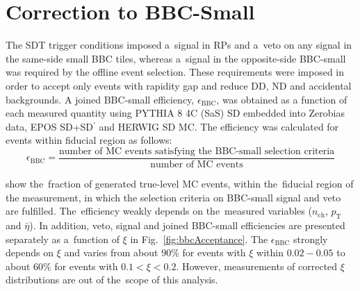 \section{Correction to BBC-Small }\label{section:star_bbc}
The SDT trigger conditions imposed a~signal in RPs and a~veto on any signal in the same-side small BBC tiles, whereas a~signal in the opposite-side BBC-small was required by the offline event selection. These requirements were imposed in order to accept only events with rapidity gap and reduce \ac{DD}, \ac{ND} and accidental backgrounds.  A joined BBC-small efficiency, $\epsilon_\textrm{BBC}$, was obtained as a function of each measured quantity using  PYTHIA 8 4C (SaS) SD embedded into Zerobias data, EPOS SD+SD$^\prime$ and HERWIG SD \ac{MC}. The efficiency was calculated  for events within fiducial region as follows:
\begin{equation}
\epsilon_\textrm{BBC}=\frac{\textrm{number of MC events satisfying the BBC-small selection criteria}}{\textrm{number of MC events}}
\end{equation}




 show the~fraction of generated true-level MC events, within the~fiducial region of the measurement, in which the selection criteria on BBC-small signal and veto are fulfilled. The~efficiency  weakly depends on the~measured variables ($n_\textrm{ch}$, $p_\textrm{T}$ and $\bar{\eta}$).
In addition, veto, signal and joined BBC-small efficiencies are presented separately as a~function of $\xi$ in Fig.~\ref{fig:bbcAcceptance}. The $\epsilon_\textrm{BBC}$  strongly depends on $\xi$ and varies from about $90\%$ for events with $\xi$ within $0.02-0.05$ to about $60\%$ for events with $0.1<\xi<0.2$. However, measurements of corrected $\xi$ distributions are out of the~scope of this analysis.

